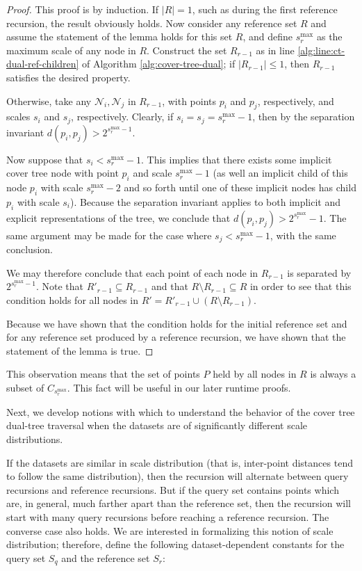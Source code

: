 \begin{proof}
This proof is by induction.  If $|R| = 1$, such as during the first reference
recursion, the result obviously holds.  Now consider any reference set $R$ and
assume the statement of the lemma holds for this set $R$, and define
$s_r^{\max}$ as the maximum scale of any node in $R$.  Construct the set
$R_{r - 1}$ as in line \ref{alg:line:ct-dual-ref-children} of Algorithm
\ref{alg:cover-tree-dual}; if $| R_{r - 1} | \le 1$, then $R_{r - 1}$ satisfies
the desired property.

Otherwise, take any $\mathscr{N}_i, \mathscr{N}_j$ in $R_{r - 1}$, with points
$p_i$ and $p_j$, respectively, and scales $s_i$ and $s_j$, respectively.
Clearly, if $s_i = s_j = s_r^{\max} - 1$, then by the separation invariant
$d(p_i, p_j) > 2^{s_r^{\max} - 1}$.

Now suppose that $s_i < s_r^{\max} - 1$.  This implies that there exists some
implicit cover tree node with point $p_i$ and scale $s_r^{\max} - 1$ (as well an
implicit child of this node $p_i$ with scale $s_r^{\max} - 2$ and so forth until
one of these implicit nodes has child $p_i$ with scale $s_i$).  Because the
separation invariant applies to both implicit and explicit representations of
the tree, we conclude that $d(p_i, p_j) > 2^{s_r^{\max}} - 1$.  The same
argument may be made for the case where $s_j < s_r^{\max} - 1$, with the same
conclusion.

We may therefore conclude that each point of each node in $R_{r - 1}$ is
separated by $2^{s_r^{\max} - 1}$.  Note that $R'_{r - 1} \subseteq R_{r - 1}$
and that $R \setminus R_{r - 1} \subseteq R$ in order to see that this condition
holds for all nodes in $R' = R'_{r - 1} \cup (R \setminus R_{r - 1})$.

Because we have shown that the condition holds for the initial reference set and
for any reference set produced by a reference recursion, we have shown that the
statement of the lemma is true.
\end{proof}

This observation means that the set of points $P$ held by all nodes in $R$ is
always a subset of $C_{s_r^{\max}}$.  This fact will be useful in our later
runtime proofs.

Next, we develop notions with which to understand the behavior of the cover tree
dual-tree traversal when the datasets are of significantly different scale
distributions.

If the datasets are similar in scale distribution (that is, inter-point distances
tend to follow the same distribution), then the recursion will alternate between
query recursions and reference recursions.  But if the query set contains points
which are, in general, much farther apart than the reference set, then the
recursion will start with many query recursions before reaching a reference
recursion.  The converse case also holds.  We are interested in formalizing
this notion of scale distribution; therefore, define the following
dataset-dependent constants for the query set $S_q$ and the reference set $S_r$:

